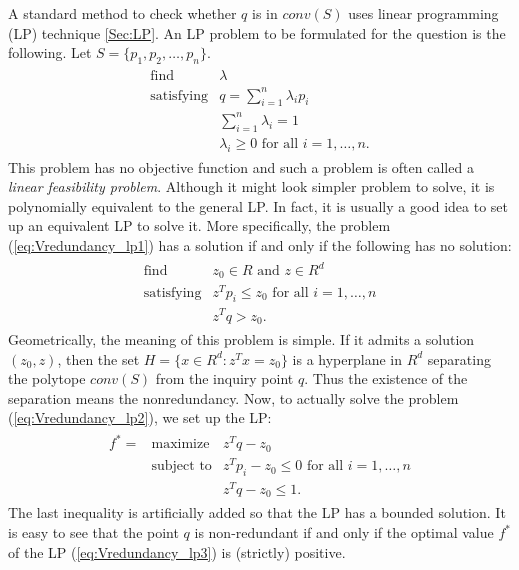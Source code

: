 \documentclass[a4paper,12pt]{article}
\begin{document}
A standard method to check
whether $q$ is in $conv(S)$ uses 
linear programming (LP) technique \ref{Sec:LP}.   
An LP problem to be formulated for
the question is the following.  Let $S=\{p_1, p_2, \ldots, p_n \}$.
\begin{align} \label{eq:Vredundancy_lp1}
\begin{array}{lll}
\text{find}        & \lambda\\
\text{satisfying}  & q = \sum_{i=1}^n \lambda_i p_i \\  
                   & \sum_{i=1}^n \lambda_i = 1\\
                   & \lambda_i \ge 0 \text{ for all } i=1, \ldots, n.
\end{array}
\end{align}
This problem has no objective function and such a problem is
often called a {\em linear feasibility problem}.  Although it
might look simpler problem to solve, it is polynomially equivalent
to the general LP.  In fact, it is usually a good idea to set up
an equivalent LP to solve it.  More specifically, the problem
(\ref{eq:Vredundancy_lp1}) has a solution if and only if the following
has no solution:
\begin{align} \label{eq:Vredundancy_lp2}
\begin{array}{lll}
\text{find}        & z_0\in R \text{ and } z \in R^d\\
\text{satisfying}  & z^T p_i \le z_0 \text{ for all } i=1, \ldots, n\\  
                   & z^T q > z_0.
\end{array}
\end{align}
Geometrically, the meaning of this problem is simple.  If it admits
a solution $(z_0, z)$, then the set $H=\{x \in R^d: z^T x = z_0 \}$
is a hyperplane in $R^d$ separating the polytope $conv(S)$ from the 
inquiry point $q$.  Thus the existence of the separation means
the nonredundancy.   Now, to actually solve the problem
(\ref{eq:Vredundancy_lp2}), we set up the LP:
\begin{align} \label{eq:Vredundancy_lp3}
\begin{array}{lll}
f^* = &\text{maximize}    & z^T q - z_0\\
&\text{subject to}  & z^T p_i - z_0  \le 0\text{ for all } i=1, \ldots, n\\  
&                   & z^T q - z_0  \le  1.
\end{array}
\end{align}
The last inequality is artificially added so that the LP has
a bounded solution.  It is easy to see that the point $q$ is 
non-redundant if and only if the optimal value $f^*$ of 
the LP (\ref{eq:Vredundancy_lp3}) is (strictly) positive.
\end{document}
